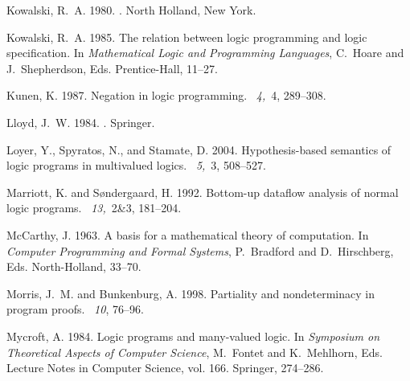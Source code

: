 \documentclass{tlp}
\begin{document}
\begin{thebibliography}{}
{\sc Kowalski, R.~A.} 1980.
.
\newblock North Holland, New York.

{\sc Kowalski, R.~A.} 1985.
\newblock The relation between logic programming and logic specification.
\newblock In {\em Mathematical Logic and Programming Languages}, {C.~Hoare}
  {and} {J.~Shepherdson}, Eds. Prentice-Hall, 11--27.

{\sc Kunen, K.} 1987.
\newblock Negation in logic programming.
~{\em 4,\/}~4, 289--308.

{\sc Lloyd, J.~W.} 1984.
.
\newblock Springer.

{\sc Loyer, Y.}, {\sc Spyratos, N.}, {\sc and} {\sc Stamate, D.} 2004.
\newblock Hypothesis-based semantics of logic programs in multivalued logics.
~{\em 5,\/}~3,
  508--527.

{\sc Marriott, K.} {\sc and} {\sc S{\o}ndergaard, H.} 1992.
\newblock Bottom-up dataflow analysis of normal logic programs.
~{\em 13,\/}~2\&3, 181--204.

{\sc McCarthy, J.} 1963.
\newblock A basis for a mathematical theory of computation.
\newblock In {\em Computer Programming and Formal Systems}, {P.~Bradford} {and}
  {D.~Hirschberg}, Eds. North-Holland, 33--70.

{\sc Morris, J.~M.} {\sc and} {\sc Bunkenburg, A.} 1998.
\newblock Partiality and nondeterminacy in program proofs.
~{\em 10}, 76--96.

{\sc Mycroft, A.} 1984.
\newblock Logic programs and many-valued logic.
\newblock In {\em Symposium on Theoretical Aspects of Computer Science},
  {M.~Fontet} {and} {K.~Mehlhorn}, Eds. Lecture Notes in Computer Science, vol.
  166. Springer, 274--286.


\end{thebibliography}
\end{document}
